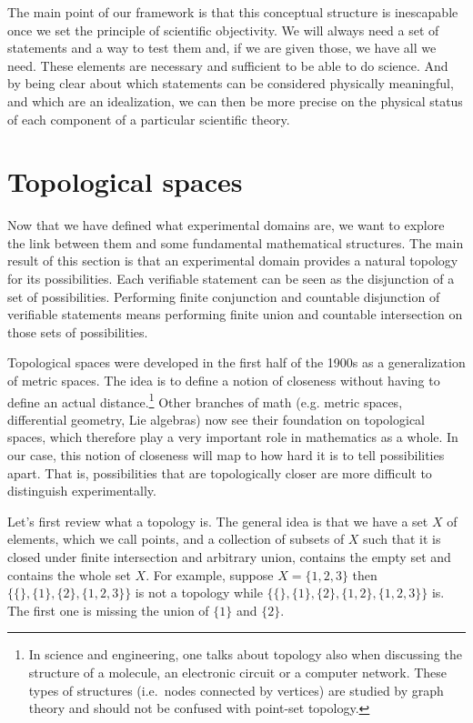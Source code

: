 \documentclass[11pt,letterpaper,fleqn]{memoir} %
\begin{document}
The main point of our framework is that this conceptual structure is inescapable once we set the principle of scientific objectivity. We will always need a set of statements and a way to test them and, if we are given those, we have all we need. These elements are necessary and sufficient to be able to do science. And by being clear about which statements can be considered physically meaningful, and which are an idealization, we can then be more precise on the physical status of each component of a particular scientific theory.

\section{Topological spaces}

Now that we have defined what experimental domains are, we want to explore the link between them and some fundamental mathematical structures. The main result of this section is that an experimental domain provides a natural topology for its possibilities. Each verifiable statement can be seen as the disjunction of a set of possibilities. Performing finite conjunction and countable disjunction of verifiable statements means performing finite union and countable intersection on those sets of possibilities.

Topological spaces were developed in the first half of the 1900s as a generalization of metric spaces. The idea is to define a notion of closeness without having to define an actual distance.\footnote{In science and engineering, one talks about topology also when discussing the structure of a molecule, an electronic circuit or a computer network. These types of structures (i.e.~nodes connected by vertices) are studied by graph theory and should not be confused with point-set topology.} Other branches of math (e.g. metric spaces, differential geometry, Lie algebras) now see their foundation on topological spaces, which therefore play a very important role in mathematics as a whole. In our case, this notion of closeness will map to how hard it is to tell possibilities apart. That is, possibilities that are topologically closer are more difficult to distinguish experimentally.

Let's first review what a topology is. The general idea is that we have a set $X$ of elements, which we call points, and a collection of subsets of $X$ such that it is closed under finite intersection and arbitrary union, contains the empty set and contains the whole set $X$. For example, suppose $X=\{1,2,3\}$ then $\{\{\}, \{1\}, \{2\},\{1,2,3\}\}$ is not a topology while $\{\{\}, \{1\}, \{2\},\{1,2\},\{1,2,3\}\}$ is. The first one is missing the union of $\{1\}$ and $\{2\}$.
\end{document}
